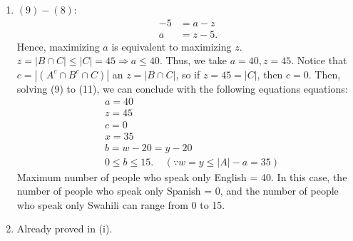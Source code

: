 \documentclass{article}
\begin{document}
\begin{enumerate}[label={(\roman*)}]
    \item 
    $(9)-(8)$:
    \begin{align}
        -5 &= a-z \nonumber\\
        a & = z-5. \nonumber
    \end{align}
    Hence, maximizing $a$ is equivalent to maximizing $z$. 
    $z=|B\cap C|\le |C|=45\Rightarrow a \le 40$.
    Thus, we take $a=40, z=45.$ 
    Notice that $c=|(A^c\cap B^c\cap C)|$ an $z=|B\cap C|$, so if $z=45=|C|$, then $c=0$.
    Then, solving (9) to (11), we can conclude with the following equations equations:
    \begin{align}
        & a = 40 \nonumber\\
        & z = 45 \nonumber\\
        & c = 0 \nonumber\\
        & x = 35 \nonumber\\
        & b = w - 20 = y - 20 \nonumber\\
        & 0 \le b \le 15. ~~~~~ (\because w = y \le |A| - a = 35) \nonumber
    \end{align}
    Maximum number of people who speak only English = 40. In this case, the number of people who speak only Spanish = 0, and the number of people who speak only Swahili can range from 0 to 15.
    \item 
    Already proved in (i). 
\end{enumerate}
\end{document}
